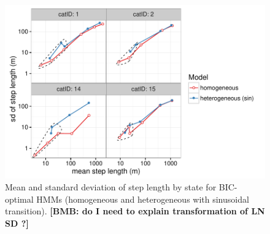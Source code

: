 \documentclass{bmcart}
\newcommand{\bmb}[1]{\textbf{[BMB: #1]}}
\begin{document}
\begin{backmatter}
\begin{figure}[h!]
   \includegraphics[width=5in]{figure/r_msdlist-1}
  \caption{ Mean and standard deviation of  step length by state for BIC-optimal HMMs (homogeneous and heterogeneous with sinusoidal transition). \bmb{do I need to explain transformation of LN SD ?}}
      \end{figure}
      
\end{backmatter}
\end{document}
